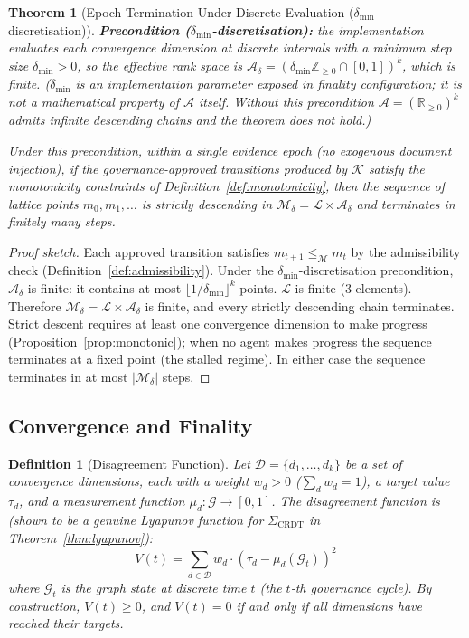 \documentclass[11pt]{article}
\newtheorem{definition}{Definition}
\newtheorem{theorem}{Theorem}
\begin{document}
\begin{theorem}[Epoch Termination Under Discrete Evaluation ($\delta_{\min}$-discretisation)]
\label{thm:termination}
\textbf{Precondition ($\delta_{\min}$-discretisation):} the implementation evaluates each convergence dimension at discrete intervals with a minimum step size $\delta_{\min} > 0$, so the effective rank space is $\mathcal{A}_\delta = (\delta_{\min}\mathbb{Z}_{\geq 0} \cap [0,1])^k$, which is finite. ($\delta_{\min}$ is an implementation parameter exposed in finality configuration; it is not a mathematical property of $\mathcal{A}$ itself. Without this precondition $\mathcal{A} = (\mathbb{R}_{\geq 0})^k$ admits infinite descending chains and the theorem does not hold.)

Under this precondition, within a single evidence epoch (no exogenous document injection), if the governance-approved transitions produced by $\mathcal{K}$ satisfy the monotonicity constraints of Definition~\ref{def:monotonicity}, then the sequence of lattice points $m_0, m_1, \ldots$ is strictly descending in $\mathcal{M}_\delta = \mathcal{L} \times \mathcal{A}_\delta$ and terminates in finitely many steps.
\end{theorem}

\begin{proof}[Proof sketch]
Each approved transition satisfies $m_{t+1} \leq_{\mathcal{M}} m_t$ by the admissibility check (Definition~\ref{def:admissibility}). Under the $\delta_{\min}$-discretisation precondition, $\mathcal{A}_\delta$ is finite: it contains at most $\lfloor 1/\delta_{\min} \rfloor^k$ points. $\mathcal{L}$ is finite (3 elements). Therefore $\mathcal{M}_\delta = \mathcal{L} \times \mathcal{A}_\delta$ is finite, and every strictly descending chain terminates. Strict descent requires at least one convergence dimension to make progress (Proposition~\ref{prop:monotonic}); when no agent makes progress the sequence terminates at a fixed point (the stalled regime). In either case the sequence terminates in at most $|\mathcal{M}_\delta|$ steps.
\end{proof}

\subsection{Convergence and Finality}

\begin{definition}[Disagreement Function]
\label{def:lyapunov}
Let $\mathcal{D} = \{d_1, \ldots, d_k\}$ be a set of convergence dimensions, each with a weight $w_d > 0$ ($\sum_d w_d = 1$), a target value $\tau_d$, and a measurement function $\mu_d : \mathcal{G} \to [0,1]$. The disagreement function is (shown to be a genuine Lyapunov function for $\Sigma_{\mathrm{CRDT}}$ in Theorem~\ref{thm:lyapunov}):
\[
V(t) = \sum_{d \in \mathcal{D}} w_d \cdot (\tau_d - \mu_d(\mathcal{G}_t))^2
\]
where $\mathcal{G}_t$ is the graph state at discrete time $t$ (the $t$-th governance cycle). By construction, $V(t) \geq 0$, and $V(t) = 0$ if and only if all dimensions have reached their targets.
\end{definition}
\end{document}
